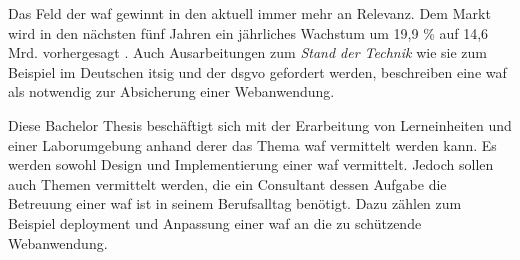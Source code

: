 \label{chap:einleitung}


Das Feld der \ac{waf} gewinnt in den aktuell immer mehr an Relevanz.
Dem Markt wird in den nächsten fünf Jahren ein jährliches Wachstum um 19,9 \% auf 14,6 Mrd. vorhergesagt \cite{WebApplicationFirewall}.
Auch Ausarbeitungen zum \textit{Stand der Technik} wie sie zum Beispiel im Deutschen \ac{itsig} und der \ac{dsgvo} gefordert werden, beschreiben eine \ac{waf} als notwendig zur Absicherung einer Webanwendung\cite[3.1.19 Schutz von Webanwendungen]{StandTechnik}.


Diese Bachelor Thesis beschäftigt sich mit der Erarbeitung von Lerneinheiten und einer Laborumgebung anhand derer das Thema \ac{waf} vermittelt werden kann.
Es werden sowohl Design und Implementierung einer \ac{waf} vermittelt. Jedoch sollen auch Themen vermittelt werden, die ein Consultant dessen Aufgabe die Betreuung einer \ac{waf} ist in seinem Berufsalltag benötigt. Dazu zählen zum Beispiel deployment und Anpassung einer \ac{waf} an die zu schützende Webanwendung.


\pagebreak
